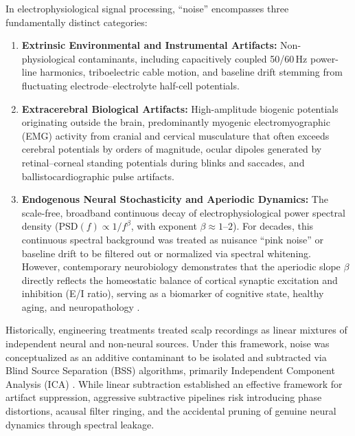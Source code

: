 \documentclass[preprint,12pt]{elsarticle}
\begin{document}
In electrophysiological signal processing, ``noise'' encompasses three fundamentally distinct categories:
\begin{enumerate}
    \item \textbf{Extrinsic Environmental and Instrumental Artifacts:} Non-physiological contaminants, including capacitively coupled 50/60\,Hz power-line harmonics, triboelectric cable motion, and baseline drift stemming from fluctuating electrode--electrolyte half-cell potentials.
    \item \textbf{Extracerebral Biological Artifacts:} High-amplitude biogenic potentials originating outside the brain, predominantly myogenic electromyographic (EMG) activity from cranial and cervical musculature that often exceeds cerebral potentials by orders of magnitude, ocular dipoles generated by retinal--corneal standing potentials during blinks and saccades, and ballistocardiographic pulse artifacts.
    \item \textbf{Endogenous Neural Stochasticity and Aperiodic Dynamics:} The scale-free, broadband continuous decay of electrophysiological power spectral density ($\text{PSD}(f) \propto 1/f^\beta$, with exponent $\beta \approx 1$--$2$). For decades, this continuous spectral background was treated as nuisance ``pink noise'' or baseline drift to be filtered out or normalized via spectral whitening. However, contemporary neurobiology demonstrates that the aperiodic slope $\beta$ directly reflects the homeostatic balance of cortical synaptic excitation and inhibition (E/I ratio), serving as a biomarker of cognitive state, healthy aging, and neuropathology \cite{gerster2022separating, porcaro2026quantifying}.
\end{enumerate}

Historically, engineering treatments treated scalp recordings as linear mixtures of independent neural and non-neural sources. Under this framework, noise was conceptualized as an additive contaminant to be isolated and subtracted via Blind Source Separation (BSS) algorithms, primarily Independent Component Analysis (ICA) \cite{delorme2004eeglab, jung2000removing, hyvarinen1999fast, bell1995information}. While linear subtraction established an effective framework for artifact suppression, aggressive subtractive pipelines risk introducing phase distortions, acausal filter ringing, and the accidental pruning of genuine neural dynamics through spectral leakage. 
\end{document}
